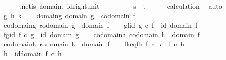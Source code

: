 \begin{isabellebody}
\ \ \ \ \isamarkupfalse%
\ {\isacharparenleft}{\kern0pt}metis\ domain{\isacharunderscore}{\kern0pt}t\ id{\isacharunderscore}{\kern0pt}right{\isacharunderscore}{\kern0pt}unit{\isacharparenright}{\kern0pt}\ \ \ \ \isanewline
\ \ \isamarkupfalse%
\ \isamarkupfalse%
\ {\isachardoublequoteopen}s\ {\isacharequal}{\kern0pt}\ t{\isachardoublequoteclose}\isanewline
\ \ \ \ \isamarkupfalse%
\ calculation\ \isamarkupfalse%
\ auto\isanewline
{}\isamarkupfalse%
\isanewline
\ \ \isamarkupfalse%
\ g\ h\ k\isanewline
\ \ \isamarkupfalse%
\ domain{\isacharunderscore}{\kern0pt}g{\isacharcolon}{\kern0pt}\ {\isachardoublequoteopen}domain\ g\ {\isacharequal}{\kern0pt}\ codomain\ f{\isachardoublequoteclose}\isanewline
\ \ \isamarkupfalse%
\ codomain{\isacharunderscore}{\kern0pt}g{\isacharcolon}{\kern0pt}\ {\isachardoublequoteopen}codomain\ g\ {\isacharequal}{\kern0pt}\ domain\ f{\isachardoublequoteclose}\isanewline
\ \ \isamarkupfalse%
\ gf{\isacharunderscore}{\kern0pt}id{\isacharcolon}{\kern0pt}\ {\isachardoublequoteopen}g\ {\isasymcirc}\isactrlsub c\ f\ {\isacharequal}{\kern0pt}\ id\ {\isacharparenleft}{\kern0pt}domain\ f{\isacharparenright}{\kern0pt}{\isachardoublequoteclose}\isanewline
\ \ \isamarkupfalse%
\ fg{\isacharunderscore}{\kern0pt}id{\isacharcolon}{\kern0pt}\ {\isachardoublequoteopen}f\ {\isasymcirc}\isactrlsub c\ g\ {\isacharequal}{\kern0pt}\ id\ {\isacharparenleft}{\kern0pt}domain\ g{\isacharparenright}{\kern0pt}{\isachardoublequoteclose}\isanewline
\ \ \isamarkupfalse%
\ codomain{\isacharunderscore}{\kern0pt}h{\isacharcolon}{\kern0pt}\ {\isachardoublequoteopen}codomain\ h\ {\isacharequal}{\kern0pt}\ domain\ f{\isachardoublequoteclose}\isanewline
\ \ \isamarkupfalse%
\ codomain{\isacharunderscore}{\kern0pt}k{\isacharcolon}{\kern0pt}\ {\isachardoublequoteopen}codomain\ k\ {\isacharequal}{\kern0pt}\ domain\ f{\isachardoublequoteclose}\isanewline
\ \ \isamarkupfalse%
\ fk{\isacharunderscore}{\kern0pt}eq{\isacharunderscore}{\kern0pt}fh{\isacharcolon}{\kern0pt}\ {\isachardoublequoteopen}f\ {\isasymcirc}\isactrlsub c\ k\ {\isacharequal}{\kern0pt}\ f\ {\isasymcirc}\isactrlsub c\ h{\isachardoublequoteclose}\isanewline
\isanewline
\ \ \isamarkupfalse%
\ {\isachardoublequoteopen}h\ {\isacharequal}{\kern0pt}\ id{\isacharparenleft}{\kern0pt}domain\ f{\isacharparenright}{\kern0pt}\ {\isasymcirc}\isactrlsub c\ h{\isachardoublequoteclose}\isanewline

\end{isabellebody}
